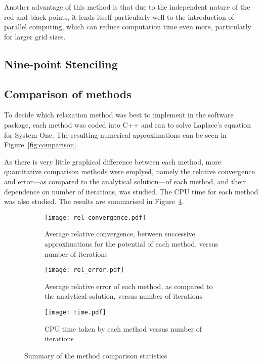 \documentclass[12pt, a4paper]{article}
\begin{document}
Another advantage of this method is that due to the independent nature of the red and
black points, it lends itself particularly well to the introduction of parallel 
computing, which can reduce computation time even more, particularly for larger grid
sizes.

\subsection{Nine-point Stenciling}


\subsection{Comparison of methods}

To decide which relaxation method was best to implement in the software package,
each method was coded into C++ and ran to solve Laplace's equation for System One.
The resulting numerical approximations can be seen in Figure~\ref{fig:comparison}.


As there is very little graphical difference between each method, more quantitative
comparison methods were emplyed, namely the relative convergence and error---as
compared to the analytical solution---of each method, and their dependence on number
of iterations, was studied. The CPU time for each method was also studied. The results
are summarised in Figure~\ref{fig:stats}.

\begin{figure}
\centering
\begin{subfigure}{0.8\textwidth}
	\texttt{[image: rel\_convergence.pdf]}
	\caption{Average relative convergence, between successive approximations for the potential of each method, versus number of iterations}
	\label{fig:conv}
\end{subfigure}

\begin{subfigure}{0.8\textwidth}
	\texttt{[image: rel\_error.pdf]}
	\caption{Average relative error of each method, as compared to the analytical solution, versus number of iterations}
	\label{fig:err}
\end{subfigure}

\begin{subfigure}{0.8\textwidth}
	\texttt{[image: time.pdf]}
	\caption{CPU time taken by each method versus number of iterations}
	\label{fig:time}
\end{subfigure}
\caption{Summary of the method comparison statistics}
\label{fig:stats}
\end{figure}
\end{document}

